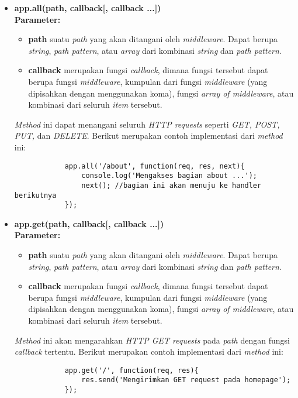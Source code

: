\begin{itemize}
	\item \textbf{app.all(path, callback[, callback ...])} \\ \textbf{Parameter:} 
		\begin{itemize}
			\item \textbf{path} suatu \textit{path} yang akan ditangani oleh \textit{middleware}. Dapat berupa \textit{string}, \textit{path pattern}, atau \textit{array} dari kombinasi \textit{string} dan \textit{path pattern}.
			
			\item \textbf{callback} merupakan fungsi \textit{callback}, dimana fungsi tersebut dapat berupa fungsi \textit{middleware}, kumpulan dari fungsi \textit{middleware} (yang dipisahkan dengan menggunakan koma), fungsi \textit{array of middleware}, atau kombinasi dari seluruh \textit{item} tersebut.
		\end{itemize}
	
		\textit{Method} ini dapat menangani seluruh \textit{HTTP requests} seperti \textit{GET, POST, PUT,} dan \textit{DELETE}. Berikut merupakan contoh implementasi dari \textit{method} ini:
		\begin{lstlisting}
			app.all('/about', function(req, res, next){
				console.log('Mengakses bagian about ...');
				next(); //bagian ini akan menuju ke handler berikutnya
			});
		\end{lstlisting}
	
	\item \textbf{app.get(path, callback[, callback ...])} \\ \textbf{Parameter:}
		\begin{itemize}
			\item \textbf{path} suatu \textit{path} yang akan ditangani oleh \textit{middleware}. Dapat berupa \textit{string}, \textit{path pattern}, atau \textit{array} dari kombinasi \textit{string} dan \textit{path pattern}.
			
			\item \textbf{callback} merupakan fungsi \textit{callback}, dimana fungsi tersebut dapat berupa fungsi \textit{middleware}, kumpulan dari fungsi \textit{middleware} (yang dipisahkan dengan menggunakan koma), fungsi \textit{array of middleware}, atau kombinasi dari seluruh \textit{item} tersebut.
		\end{itemize}
		
		\textit{Method} ini akan mengarahkan \textit{HTTP GET requests} pada \textit{path} dengan fungsi \textit{callback} tertentu. Berikut merupakan contoh implementasi dari \textit{method} ini:
		\begin{lstlisting}
			app.get('/', function(req, res){
				res.send('Mengirimkan GET request pada homepage');
			});
		\end{lstlisting}
		

\end{itemize}
